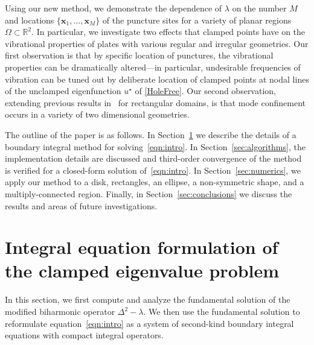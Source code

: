 \documentclass[times]{article}
\newcommand{\xx}{\mathbf{x}}
\begin{document}
Using our new method, we demonstrate the dependence of $\lambda$ on the
number $M$ and locations $\{\xx_1, \ldots,\xx_M \}$ of the puncture
sites for a variety of planar regions $\Omega \subset \mathbb{R}^2$.
In particular, we investigate two effects that clamped points have on
the vibrational properties of plates with various regular and irregular
geometries. Our first observation is that by specific location of
punctures, the vibrational properties can be dramatically altered---in
particular, undesirable frequencies of vibration can be tuned out by
deliberate location of clamped points at nodal lines of the unclamped
eigenfunction $u^{\star}$ of \eqref{HoleFree}. Our second observation,
extending previous results in~\cite{FM} for rectangular domains, is
that mode confinement occurs in a variety of two dimensional geometries.

The outline of the paper is as follows. In Section~\ref{sec:methods} we
describe the details of a boundary integral method for
solving~\eqref{eqn:intro}. In Section~\ref{sec:algorithms}, the
implementation details are discussed and third-order convergence of the
method is verified for a closed-form solution of~\eqref{eqn:intro}.  In
Section~\ref{sec:numerics}, we apply our method to a disk, rectangles,
an ellipse, a non-symmetric shape, and a multiply-connected region.
Finally, in Section~\ref{sec:conclusions} we discuss the results and
areas of future investigations.


\section{Integral equation formulation of the clamped eigenvalue
problem}
\label{sec:methods}
In this section, we first compute and analyze the fundamental solution
of the modified biharmonic operator $\Delta^2 - \lambda$.  We then use
the fundamental solution to reformulate equation~\eqref{eqn:intro} as a
system of second-kind boundary integral equations with compact integral
operators.

\end{document}
